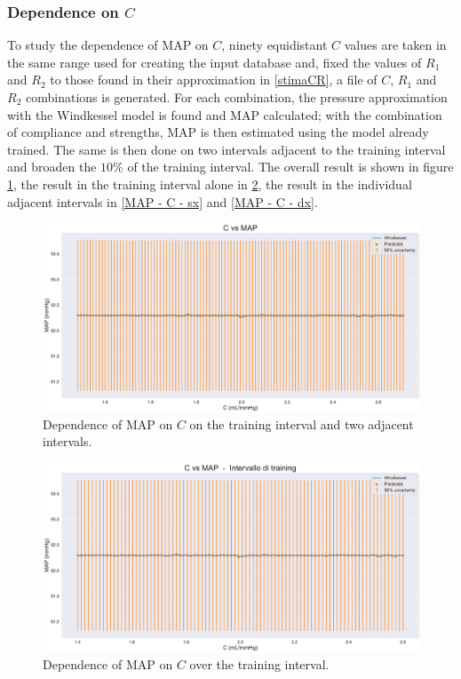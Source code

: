 \subsubsection{Dependence on $C$}
To study the dependence of MAP on $C$, ninety equidistant $C$ values are taken in the same range used for creating the input database and, fixed the values of $R_1$ and $R_2$ to those found in their approximation in \ref{stimaCR}, a file of $C$, $R_1$ and $R_2$ combinations is generated. For each combination, the pressure approximation with the Windkessel model is found and MAP calculated; with the combination of compliance and strengths, MAP is then estimated using the model already trained. The same is then done on two intervals adjacent to the training interval and broaden the $10\%$ of the training interval. The overall result is shown in figure \ref{MAP - C - full}, the result in the training interval alone in \ref{MAP - C - training}, the result in the individual adjacent intervals in \ref{MAP - C - sx} and \ref{MAP - C - dx}.

\begin{figure}
    \centering
    \includegraphics[width=1\textwidth]{images/Training (risultati)/MAP/MAP - C - full.pdf}
    \caption{Dependence of MAP on $C$ on the training interval and two adjacent intervals.}
    \label{MAP - C - full}
\end{figure}


\begin{figure}
    \centering
    \includegraphics[width=1\textwidth]{images/Training (risultati)/MAP/MAP - C - training.pdf}
    \caption{Dependence of MAP on $C$ over the training interval.}
    \label{MAP - C - training}
\end{figure}


